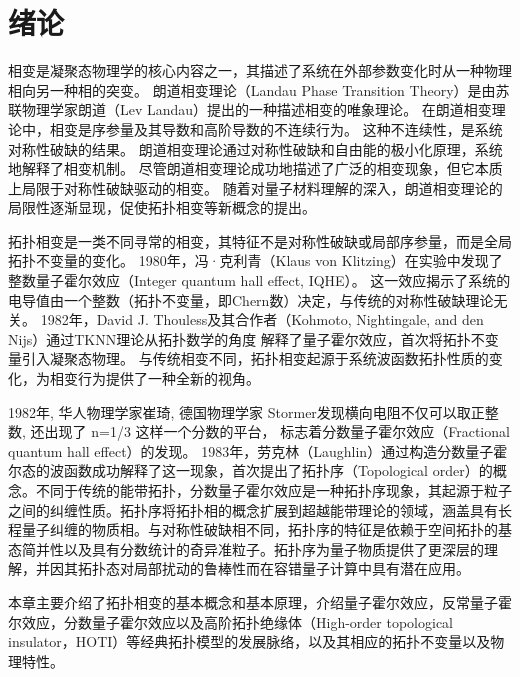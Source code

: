 \chapter{绪论}
相变是凝聚态物理学的核心内容之一，其描述了系统在外部参数变化时从一种物理相向另一种相的突变。
朗道相变理论（Landau Phase Transition Theory）是由苏联物理学家朗道（Lev Landau）提出的一种描述相变的唯象理论\cite{landau1937theory,landau1980statistical}。
在朗道相变理论中，相变是序参量及其导数和高阶导数的不连续行为。
这种不连续性，是系统对称性破缺的结果。
朗道相变理论通过对称性破缺和自由能的极小化原理，系统地解释了相变机制。
尽管朗道相变理论成功地描述了广泛的相变现象，但它本质上局限于对称性破缺驱动的相变。
随着对量子材料理解的深入，朗道相变理论的局限性逐渐显现，促使拓扑相变等新概念的提出。

拓扑相变是一类不同寻常的相变，其特征不是对称性破缺或局部序参量，而是全局拓扑不变量的变化。
1980年，冯·克利青（Klaus von Klitzing）在实验中发现了整数量子霍尔效应（Integer quantum hall effect, IQHE）\cite{klitzing1980new}。
这一效应揭示了系统的电导值由一个整数（拓扑不变量，即Chern数）决定，与传统的对称性破缺理论无关。
1982年，David J. Thouless及其合作者（Kohmoto, Nightingale, and den Nijs）通过TKNN理论从拓扑数学的角度
解释了量子霍尔效应\cite{thouless1982quantized}，首次将拓扑不变量引入凝聚态物理。
与传统相变不同，拓扑相变起源于系统波函数拓扑性质的变化，为相变行为提供了一种全新的视角。

1982年, 华人物理学家崔琦, 德国物理学家 Stormer发现横向电阻不仅可以取正整数, 还出现了 n=1/3 这样一个分数的平台\cite{tsui1982two}，
标志着分数量子霍尔效应（Fractional quantum hall effect）的发现。
1983年，劳克林（Laughlin）通过构造分数量子霍尔态的波函数成功解释了这一现象\cite{laughlin1983anomalous}，首次提出了拓扑序（Topological order）的概念。不同于传统的能带拓扑，分数量子霍尔效应是一种拓扑序现象，其起源于粒子之间的纠缠性质。拓扑序将拓扑相的概念扩展到超越能带理论的领域，涵盖具有长程量子纠缠的物质相。与对称性破缺相不同，拓扑序的特征是依赖于空间拓扑的基态简并性以及具有分数统计的奇异准粒子。拓扑序为量子物质提供了更深层的理解，并因其拓扑态对局部扰动的鲁棒性而在容错量子计算中具有潜在应用。

本章主要介绍了拓扑相变的基本概念和基本原理，介绍量子霍尔效应，反常量子霍尔效应，分数量子霍尔效应以及高阶拓扑绝缘体（High-order topological insulator，HOTI）等经典拓扑模型的发展脉络，以及其相应的拓扑不变量以及物理特性。
